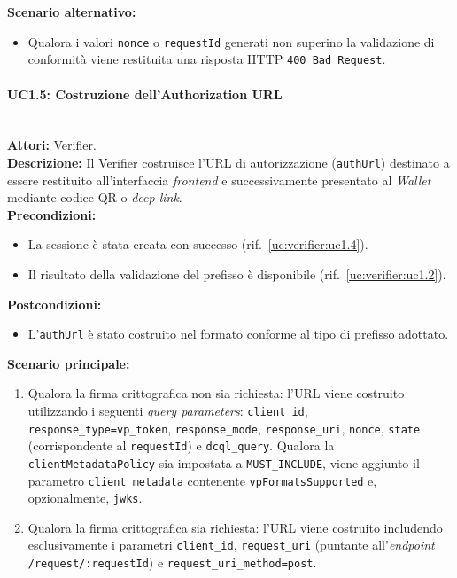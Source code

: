 \noindent\textbf{Scenario alternativo:}
\begin{itemize}
    \item Qualora i valori \texttt{nonce} o \texttt{requestId} generati non superino la validazione di conformità viene restituita una risposta HTTP \texttt{400 Bad Request}.
\end{itemize}

\paragraph{\large\bfseries UC1.5: Costruzione dell'Authorization URL}\mbox{}\\
\noindent\textbf{Attori:} Verifier.
\\
\noindent\textbf{Descrizione:} Il Verifier costruisce l'URL di autorizzazione (\texttt{authUrl}) destinato a essere restituito all'interfaccia \textit{frontend} e successivamente presentato al \textit{Wallet} mediante codice QR o \textit{deep link}.
\\
\noindent\textbf{Precondizioni:}
\begin{itemize}
    \item La sessione è stata creata con successo (rif.\ \ref{uc:verifier:uc1.4}).
    \item Il risultato della validazione del prefisso è disponibile (rif.\ \ref{uc:verifier:uc1.2}).
\end{itemize}
\noindent\textbf{Postcondizioni:}
\begin{itemize}
    \item L'\texttt{authUrl} è stato costruito nel formato conforme al tipo di prefisso adottato.
\end{itemize}
\noindent\textbf{Scenario principale:}
\begin{enumerate}
    \item Qualora la firma crittografica non sia richiesta: l'URL viene costruito utilizzando i seguenti \textit{query parameters}: \texttt{client\_\allowbreak{}id}, \texttt{response\_\allowbreak{}type=vp\_\allowbreak{}token}, \texttt{response\_\allowbreak{}mode}, \texttt{response\_\allowbreak{}uri}, \texttt{nonce}, \texttt{state} (corrispondente al \texttt{requestId}) e \texttt{dcql\_\allowbreak{}query}. Qualora la \texttt{clientMetadataPolicy} sia impostata a \texttt{MUST\_\allowbreak{}INCLUDE}, viene aggiunto il parametro \texttt{client\_\allowbreak{}metadata} contenente \texttt{vpFormatsSupported} e, opzionalmente, \texttt{jwks}.
    \item Qualora la firma crittografica sia richiesta: l'URL viene costruito includendo esclusivamente i parametri \texttt{client\_\allowbreak{}id}, \texttt{request\_\allowbreak{}uri} (puntante all'\textit{endpoint} \texttt{/request/:reques\-\allowbreak{}tId}) e \texttt{request\_\allowbreak{}uri\_\allowbreak{}method=post}.
\end{enumerate}

